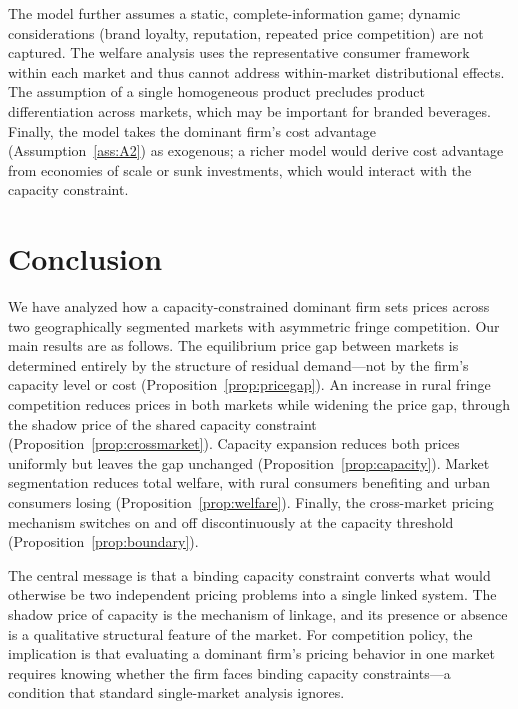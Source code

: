 \documentclass[12pt]{article}
\theoremstyle{plain}
\theoremstyle{definition}
\theoremstyle{remark}
\begin{document}
The model further assumes a static, complete-information game; dynamic
considerations (brand loyalty, reputation, repeated price competition) are
not captured.  The welfare analysis
uses the representative consumer framework within each market and thus cannot
address within-market distributional effects.  The assumption of a single
homogeneous product precludes product differentiation across markets, which may
be important for branded beverages.  Finally, the model takes the dominant firm's
cost advantage (Assumption~\ref{ass:A2}) as exogenous; a richer model would
derive cost advantage from economies of scale or sunk investments, which would
interact with the capacity constraint.

\section{Conclusion}
\label{sec:conclusion}

We have analyzed how a capacity-constrained dominant firm sets prices across two
geographically segmented markets with asymmetric fringe competition.  Our main
results are as follows.  The equilibrium price gap between markets is determined
entirely by the structure of residual demand---not by the firm's capacity level
or cost (Proposition~\ref{prop:pricegap}).  An increase in rural fringe
competition reduces prices in both markets while widening the price gap, through
the shadow price of the shared capacity constraint (Proposition~\ref{prop:crossmarket}).
Capacity expansion reduces both prices uniformly but leaves the gap unchanged
(Proposition~\ref{prop:capacity}).  Market segmentation reduces total welfare,
with rural consumers benefiting and urban consumers losing
(Proposition~\ref{prop:welfare}).  Finally, the cross-market pricing mechanism
switches on and off discontinuously at the capacity threshold
(Proposition~\ref{prop:boundary}).

The central message is that a binding capacity constraint converts what would
otherwise be two independent pricing problems into a single linked system.  The
shadow price of capacity is the mechanism of linkage, and its presence or absence
is a qualitative structural feature of the market.  For competition policy, the
implication is that evaluating a dominant firm's pricing behavior in one market
requires knowing whether the firm faces binding capacity constraints---a condition
that standard single-market analysis ignores.
\end{document}
